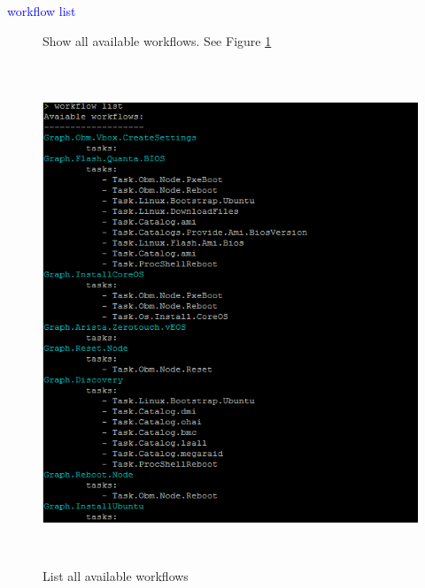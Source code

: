 \documentclass [12pt, a4paper, titlepage]{article}
\begin{document}
        \begin{description}
            \item[\textcolor{blue}{workflow list}] Show all available workflows. See Figure \ref{workflows1}
        \end{description}
        \begin{figure}[H]
        \begin{center}
        \includegraphics[width=13cm,height=15cm]{png/workflows1.png}
        \end{center}
        \caption{List all available workflows}
        \label{workflows1}
        \end{figure}
\end{document}
